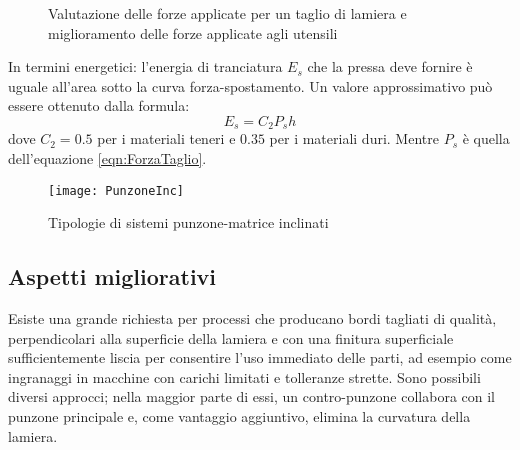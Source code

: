 \begin{figure}
\centering
{}\quad
{}\quad
{}
\caption{Valutazione delle forze applicate per un taglio di lamiera e miglioramento delle forze applicate agli utensili}
\label{fig:ValForzeTaglio}
\end{figure}

In termini energetici: l'energia di tranciatura $E_s$ che la pressa deve fornire è uguale all'area sotto la curva forza-spostamento. Un valore approssimativo può essere ottenuto dalla formula:
\begin{equation}
E_s = C_2 P_s h
\end{equation}
dove $C_2 = 0.5$ per i materiali teneri e $0.35$ per i materiali duri.
Mentre $P_s$ è quella dell'equazione \eqref{eqn:ForzaTaglio}.

\begin{figure}
\centering
\texttt{[image: PunzoneInc]}
\caption{Tipologie di sistemi punzone-matrice inclinati}
\label{fig:PunzoneInc}
\end{figure}

\subsection{Aspetti migliorativi}
Esiste una grande richiesta per processi che producano bordi tagliati di qualità, perpendicolari alla superficie della lamiera e con una finitura superficiale sufficientemente liscia per consentire l'uso immediato delle parti, ad esempio come ingranaggi in macchine con carichi limitati e tolleranze strette.
Sono possibili diversi approcci; nella maggior parte di essi, un contro-punzone collabora con il punzone principale e, come vantaggio aggiuntivo, elimina la curvatura della lamiera.

